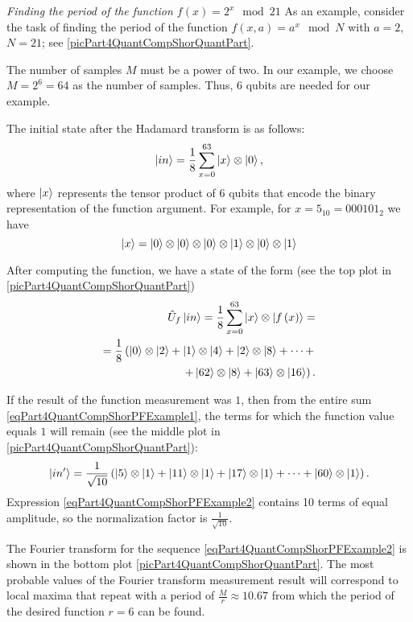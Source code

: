 \begin{example}
\emph{Finding the period of the function $f\left(x\right) = 2^x \mod 21$}
\label{exPart4QuantCompShorQuantPeriodFinding}
As an example, consider the task of finding the period of the function $f\left(x, a\right) = a^x \mod{N}$ with $a=2$, $N=21$; see \autoref{picPart4QuantCompShorQuantPart}.

The number of samples $M$ must be a power of two. In our example, we choose $M = 2^6 = 64$ as the number of samples. Thus, 6 qubits are needed for our example.

The initial state after the Hadamard transform is as follows:
\begin{equation}
\ket{in} = \frac{1}{8}\sum_{x = 0}^{63}\ket{x} \otimes \ket{0},
\nonumber
\end{equation}
where $\ket{x}$ represents the tensor product  of 6 qubits that encode the binary representation of the function argument. For example, for $x=5_{10}=000101_2$ we have
\[
\ket{x} = \ket{0}\otimes \ket{0}\otimes \ket{0}\otimes \ket{1}\otimes \ket{0}\otimes \ket{1}
\]

After computing the function, we have a state of the form (see the top plot in \autoref{picPart4QuantCompShorQuantPart})
\begin{eqnarray}
\hat{U}_f\ket{in} = \frac{1}{8}\sum_{x = 0}^{63}\ket{x} \otimes \left|f\left(x\right)\right> = 
\nonumber \\
=
\frac{1}{8}
\left(
\ket{0}\otimes\ket{2} + 
\ket{1}\otimes\ket{4} + 
\ket{2}\otimes\ket{8} + \dots +
\right.
\nonumber \\
\left.
+
\ket{62}\otimes\ket{8} +
\ket{63}\otimes\ket{16}
\right).
\label{eqPart4QuantCompShorPFExample1}
\end{eqnarray}

If the result of the function measurement was $1$, then from the entire sum \eqref{eqPart4QuantCompShorPFExample1}, the terms for which the function value equals $1$ will remain (see the middle plot in \autoref{picPart4QuantCompShorQuantPart}):
\begin{equation}
\ket{in'} = \frac{1}{\sqrt{10}}\left( 
\ket{5}\otimes\ket{1} +
\ket{11}\otimes\ket{1} +
\ket{17}\otimes\ket{1} +
\dots +
\ket{60}\otimes\ket{1}
\right).
\label{eqPart4QuantCompShorPFExample2}
\end{equation} 
Expression \eqref{eqPart4QuantCompShorPFExample2} contains 10 terms of equal amplitude, so the normalization factor is $\frac{1}{\sqrt{10}}$.

The Fourier transform for the sequence \eqref{eqPart4QuantCompShorPFExample2} is shown in the bottom plot \autoref{picPart4QuantCompShorQuantPart}. The most probable values of the Fourier transform measurement result will correspond to local maxima that repeat with a period of $\frac{M}{r}\approx10.67$ from which the period of the desired function $r=6$ can be found.

\end{example}